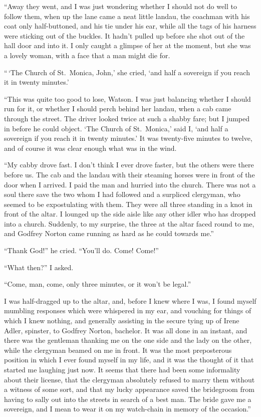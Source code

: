 “Away they went, and I was just wondering whether I
should not do well to follow them, when up the lane came a
neat little landau, the coachman with his coat only half-buttoned,
and his tie under his ear, while all the tags of his
harness were sticking out of the buckles. It hadn’t pulled up
before she shot out of the hall door and into it. I only caught
a glimpse of her at the moment, but she was a lovely woman,
with a face that a man might die for.

“\,‘The Church of St.~Monica, John,’ she cried, ‘and half a
sovereign if you reach it in twenty minutes.’

“This was quite too good to lose, Watson. I was just
balancing whether I should run for it, or whether I should
perch behind her landau, when a cab came through the street.
The driver looked twice at such a shabby fare; but I jumped
in before he could object. ‘The Church of St.~Monica,’ said
I, ‘and half a sovereign if you reach it in twenty minutes.’
It was twenty-five minutes to twelve, and of course it was
clear enough what was in the wind.

“My cabby drove fast. I don’t think I ever drove faster,
but the others were there before us. The cab and the landau
with their steaming horses were in front of the door when I
arrived. I paid the man and hurried into the church. There
was not a soul there save the two whom I had followed and a
surpliced clergyman, who seemed to be expostulating with
them. They were all three standing in a knot in front of the
altar. I lounged up the side aisle like any other idler who has
dropped into a church. Suddenly, to my surprise, the three
at the altar faced round to me, and Godfrey Norton came
running as hard as he could towards me.”

“Thank God!” he cried. “You’ll do. Come! Come!”

“What then?” I asked.

“Come, man, come, only three minutes, or it won’t be legal.”

I was half-dragged up to the altar, and, before I knew
where I was, I found myself mumbling responses which were
whispered in my ear, and vouching for things of which I knew
nothing, and generally assisting in the secure tying up of
Irene Adler, spinster, to Godfrey Norton, bachelor. It was
all done in an instant, and there was the gentleman thanking
me on the one side and the lady on the other, while the
clergyman beamed on me in front. It was the most preposterous
position in which I ever found myself in my life, and it
was the thought of it that started me laughing just now. It
seems that there had been some informality about their license,
that the clergyman absolutely refused to marry them without
a witness of some sort, and that my lucky appearance saved
the bridegroom from having to sally out into the streets in
search of a best man. The bride gave me a sovereign, and I
mean to wear it on my watch-chain in memory of the
occasion.”

